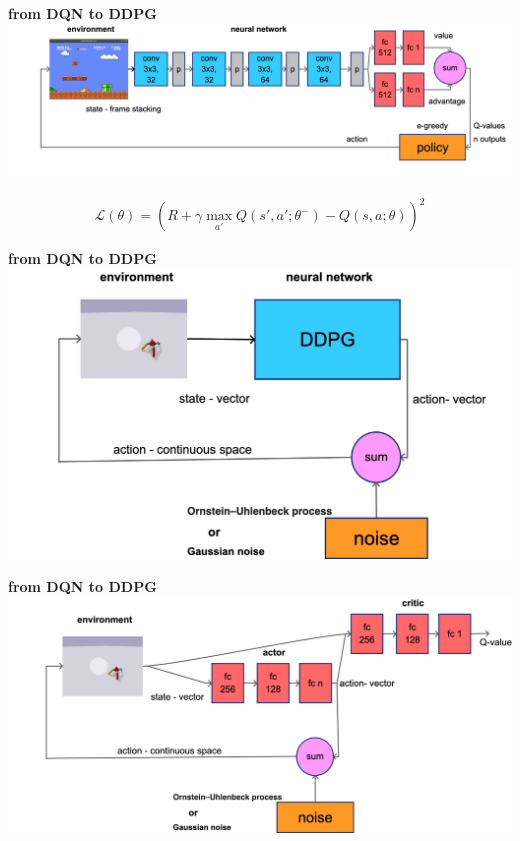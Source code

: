 \documentclass[xcolor=dvipsnames]{beamer}
\begin{document}
\begin{frame}{\bf from DQN to DDPG}
  {\centering \includegraphics[scale=0.15]{../diagrams/dqndetail.png}}

    \begin{align*}
      \mathcal{L(\theta)} = \left( R + \gamma \max \limits_{a'} Q(s', a'; \theta^-) - Q(s, a; \theta)  \right)^2
    \end{align*}
\end{frame}

\begin{frame}{\bf from DQN to DDPG}
  {\centering \includegraphics[scale=0.2]{../diagrams/ddpg.png}}
\end{frame}

\begin{frame}{\bf from DQN to DDPG}
  {\centering \includegraphics[scale=0.16]{../diagrams/ddpgdetail.png}}
\end{frame}
\end{document}
